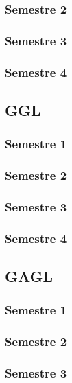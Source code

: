 \documentclass[a4paper,11pt]{article}
\begin{document}
\subsubsection{Semestre 2}

\subsubsection{Semestre 3}

\subsubsection{Semestre 4}


\subsection{GGL}

\subsubsection{Semestre 1}

\subsubsection{Semestre 2}

\subsubsection{Semestre 3}

\subsubsection{Semestre 4}


\subsection{GAGL}

\subsubsection{Semestre 1}

\subsubsection{Semestre 2}

\subsubsection{Semestre 3}
\end{document}
